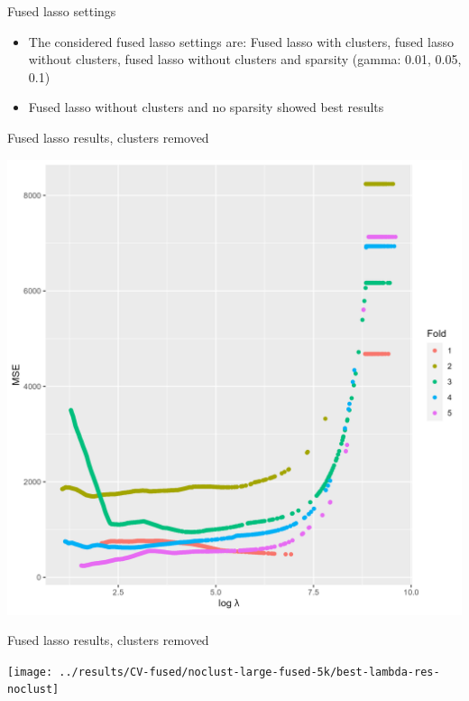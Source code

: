 \documentclass[
  ignorenonframetext,
]{beamer}
\providecommand{\tightlist}{%
  \setlength{\itemsep}{0pt}\setlength{\parskip}{0pt}}
\begin{document}
\begin{frame}{Fused lasso settings}
\protect\hypertarget{fused-lasso-settings}{}
\begin{itemize}
\tightlist
\item
  The considered fused lasso settings are: Fused lasso with clusters,
  fused lasso without clusters, fused lasso without clusters and
  sparsity (gamma: 0.01, 0.05, 0.1)
\item
  Fused lasso without clusters and no sparsity showed best results
\end{itemize}
\end{frame}

\begin{frame}{Fused lasso results, clusters removed}
\protect\hypertarget{fused-lasso-results-clusters-removed}{}
\begin{center}\includegraphics[width=0.75\linewidth]{err-line-plot-noclust} \end{center}
\end{frame}

\begin{frame}{Fused lasso results, clusters removed}
\protect\hypertarget{fused-lasso-results-clusters-removed-1}{}
\begin{center}\texttt{[image: ../results/CV-fused/noclust-large-fused-5k/best-lambda-res-noclust]} \end{center}
\end{frame}
\end{document}

